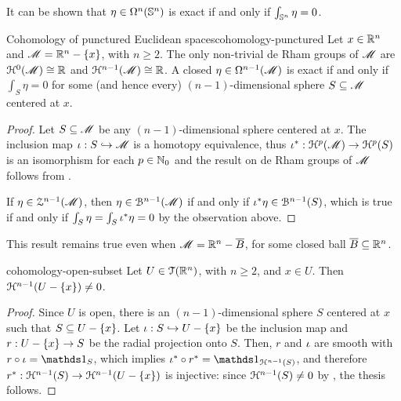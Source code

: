 It can be shown that $ \eta \in \Omega^{n}(\mathbb{S}^{n}) $ is exact if and only if $ \int_{\mathbb{S}^{n}} \eta = 0 $.

\begin{propcorollary}{Cohomology of punctured Euclidean spaces}{cohomology-punctured}
  Let $ x \in \mathbb{R}^n $ and $ \mathscr{M} = \mathbb{R}^n - \{x\} $, with $ n \geq 2 $. The only non-trivial de Rham groups of $ \mathscr{M} $ are $ \EuScript{H}^{0}(\mathscr{M}) \cong \mathbb{R} $ and $ \EuScript{H}^{n-1}(\mathscr{M}) \cong \mathbb{R} $.
  A closed $ \eta \in \Omega^{n-1}(\mathscr{M}) $ is exact if and only if $ \int_S \eta = 0 $ for some (and hence every) $ (n-1) $-dimensional sphere $ S \subseteq \mathscr{M} $ centered at $ x $.
\end{propcorollary}

\begin{proofbox}
  \begin{proof}
    Let $ S \subseteq \mathscr{M} $ be any $ (n-1) $-dimensional sphere centered at $ x $. The inclusion map $ \iota : S \hookrightarrow \mathscr{M} $ is a homotopy equivalence, thus $ \iota^* : \EuScript{H}^{p}(\mathscr{M}) \rightarrow \EuScript{H}^{p}(S) $ is an isomorphism for each $ p \in \mathbb{N}_0 $ and the result on de Rham groups of $ \mathscr{M} $ follows from .

    If $ \eta \in \EuScript{Z}^{n-1}(\mathscr{M}) $, then $ \eta \in \EuScript{B}^{n-1}(\mathscr{M}) $ if and only if $ \iota^* \eta \in \EuScript{B}^{n-1}(S) $, which is true if and only if $ \int_S \eta = \int_S \iota^* \eta = 0 $ by the observation above.
  \end{proof}
\end{proofbox}

This result remains true even when $ \mathscr{M} = \mathbb{R}^n - \overline{B} $, for some closed ball $ \overline{B} \subseteq \mathbb{R}^n $.

\begin{propcorollary}{}{cohomology-open-subset}
  Let $ U \in \EuScript{T}(\mathbb{R}^n) $, with $ n \geq 2 $, and $ x \in U $. Then $ \EuScript{H}^{n-1}(U - \{x\}) \neq 0 $.
\end{propcorollary}

\begin{proofbox}
  \begin{proof}
    Since $ U $ is open, there is an $ (n-1) $-dimensional sphere $ S $ centered at $ x $ such that $ S \subseteq U - \{x\} $. Let $ \iota : S \hookrightarrow U - \{x\} $ be the inclusion map and $ r : U - \{x\} \rightarrow S $ be the radial projection onto $ S $. Then, $ r $ and $ \iota $ are smooth with $ r \circ \inc = \id_S $, which implies $ \inc^* \circ r^* = \id_{\hp{n-1}(S)} $, and therefore $ r^* : \EuScript{H}^{n-1}(S) \rightarrow \EuScript{H}^{n-1}(U - \{x\}) $ is injective: since $ \EuScript{H}^{n-1}(S) \neq 0 $ by , the thesis follows.
  \end{proof}
\end{proofbox}

